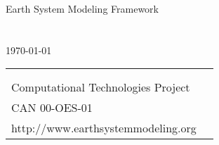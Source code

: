 %


\begin{titlepage}

\begin{center}
{\Large Earth System Modeling Framework } \\
\vspace{.25in}
{\Large {\bf \mytitle}} \\
\vspace{.75in}
{\large {\it \myauthors}} \\
\vspace{.25in}
{\large {\today}}
\vspace{.25in}
\end{center}

\begin{latexonly}
\vspace{4.5in}
\begin{tabular}{p{5in}p{.9in}}
\hrulefill \\
\noindent {\bf NASA Earth Science Technology Office} \\
\noindent Computational Technologies Project \\
\noindent CAN 00-OES-01 \\
\noindent http://www.earthsystemmodeling.org \\
\end{tabular}
\end{latexonly}

\end{titlepage}















